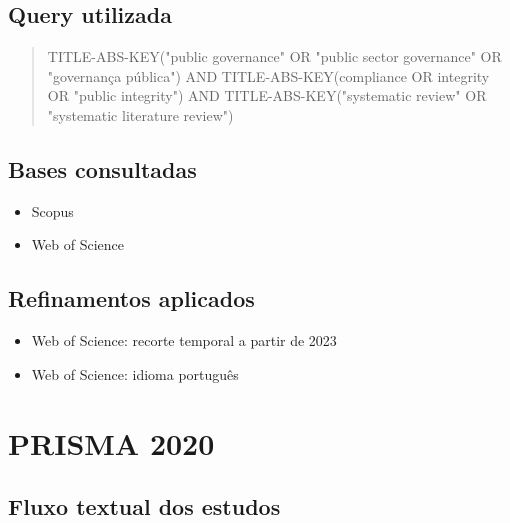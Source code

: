 \documentclass[12pt]{article}
\begin{document}
\subsection{Query utilizada}
\label{sec:org684f306}

\begin{quote}
TITLE-ABS-KEY("public governance" OR "public sector governance" OR "governança pública")
AND TITLE-ABS-KEY(compliance OR integrity OR "public integrity")
AND TITLE-ABS-KEY("systematic review" OR "systematic literature review")
\end{quote}

\subsection{Bases consultadas}
\label{sec:org9307204}
\begin{itemize}
\item Scopus
\item Web of Science
\end{itemize}

\subsection{Refinamentos aplicados}
\label{sec:org3374d15}
\begin{itemize}
\item Web of Science: recorte temporal a partir de 2023
\item Web of Science: idioma português
\end{itemize}

\section{PRISMA 2020}
\label{sec:org33dd295}

\subsection{Fluxo textual dos estudos}
\label{sec:org7e6aa5f}
\end{document}
